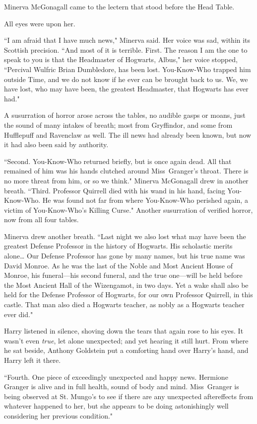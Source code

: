 Minerva McGonagall came to the lectern that stood before the Head Table.

All eyes were upon her.

``I am afraid that I have much news," Minerva said. Her voice was sad, within its Scottish precision. ``And most of it is terrible. First. The reason I am the one to speak to you is that the Headmaster of Hogwarts, Albus," her voice stopped, ``Percival Wulfric Brian Dumbledore, has been lost. You-Know-Who trapped him outside Time, and we do not know if he ever can be brought back to us. We, we have lost, who may have been, the greatest Headmaster, that Hogwarts has ever had."

A susurration of horror arose across the tables, no audible gasps or moans, just the sound of many intakes of breath; most from Gryffindor, and some from Hufflepuff and Ravenclaw as well. The ill news had already been known, but now it had also been said by authority.

``Second. You-Know-Who returned briefly, but is once again dead. All that remained of him was his hands clutched around Miss~Granger's throat. There is no more threat from him, or so we think." Minerva McGonagall drew in another breath. ``Third. Professor Quirrell died with his wand in his hand, facing You-Know-Who. He was found not far from where You-Know-Who perished again, a victim of You-Know-Who's Killing Curse." Another susurration of verified horror, now from all four tables.

Minerva drew another breath. ``Last night we also lost what may have been the greatest Defense Professor in the history of Hogwarts. His scholastic merits alone{\ldots} Our Defense Professor has gone by many names, but his true name was David Monroe. As he was the last of the Noble and Most Ancient House of Monroe, his funeral—his second funeral, and the true one—will be held before the Most Ancient Hall of the Wizengamot, in two days. Yet a wake shall also be held for the Defense Professor of Hogwarts, for our own Professor Quirrell, in this castle. That man also died a Hogwarts teacher, as nobly as a Hogwarts teacher ever did."

Harry listened in silence, shoving down the tears that again rose to his eyes. It wasn't even \emph{true}, let alone unexpected; and yet hearing it still hurt. From where he sat beside, Anthony Goldstein put a comforting hand over Harry's hand, and Harry left it there.

``Fourth. One piece of exceedingly unexpected and happy news. Hermione Granger is alive and in full health, sound of body and mind. Miss~Granger is being observed at St. Mungo's to see if there are any unexpected aftereffects from whatever happened to her, but she appears to be doing astonishingly well considering her previous condition."

